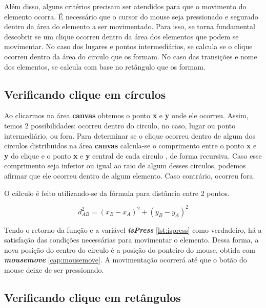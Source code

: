 \documentclass[
	12pt,				%
	openright,			%
	oneside,			%
	a4paper,			%
	english,			%
	brazil				%
	]{abntex2}
\begin{document}
Além disso, alguns critérios precisam ser atendidos para que o movimento do elemento ocorra. É necessário que o cursor do mouse seja pressionado e segurado dentro da área do elemento a ser movimentado. Para isso, se torna fundamental descobrir se um clique ocorreu dentro da área dos elementos que podem se movimentar. No caso dos lugares e pontos intermediários, se calcula se o clique ocorreu dentro da área do circulo que os formam. No caso das transições e nome dos elementos, se calcula com base no retângulo que os formam. 

\subsection*{Verificando clique em círculos}

Ao clicarmos na área \textbf{canvas} obtemos o ponto \textbf{x} e \textbf{y} onde ele ocorreu. Assim, temos 2 possibilidades: ocorreu dentro do circulo, no caso, lugar ou ponto intermediário, ou fora. Para determinar se o clique ocorreu dentro de algum dos circulos distribuidos na área \textbf{canvas} calcula-se o comprimento entre o ponto \textbf{x} e \textbf{y} do clique e o ponto \textbf{x} e \textbf{y} central de cada circulo \cite{Macoratti2014}, de forma recursiva. Caso esse comprimento seja inferior ou igual ao raio de algum desses circulos, podemos afirmar que ele ocorreu dentro de algum elemento. Caso contrário, ocorreu fora.

O cálculo é feito utilizando-se da fórmula para distância entre 2 pontos. 

\begin{equation}\label{eq:distancia_entre_pontos}
	d_{AB}^2 = (x_B - x_A)^2 + (y_B - y_A)^2
\end{equation}




Tendo o retorno da função e a variável \textbf{\textit{isPress}} \ref{lst:ispress} como verdadeiro, há a satisfação das condições necessárias para movimentar o elemento. Dessa forma, a nova posição do centro do circulo é a posição do ponteiro do mouse, obtida com \textbf{\textit{mousemove}} \ref{cap:mousemove}. A movimentação ocorrerá até que o botão do mouse deixe de ser pressionado. 

\subsection*{Verificando clique em retângulos}
\end{document}
